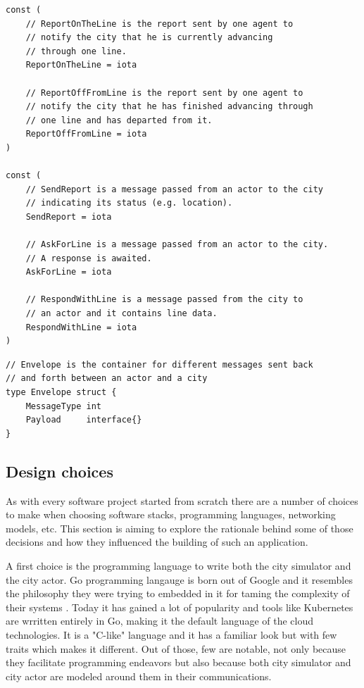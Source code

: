 \documentclass[conference]{IEEEtran}
\begin{document}
\begin{lstlisting}[caption=Go enumerations for messaging, label=lst:goactorreports]
const (   
    // ReportOnTheLine is the report sent by one agent to
    // notify the city that he is currently advancing
    // through one line.
    ReportOnTheLine = iota
    
    // ReportOffFromLine is the report sent by one agent to
    // notify the city that he has finished advancing through
    // one line and has departed from it.
    ReportOffFromLine = iota
)
    
const (
    // SendReport is a message passed from an actor to the city
    // indicating its status (e.g. location).
    SendReport = iota
    
    // AskForLine is a message passed from an actor to the city.
    // A response is awaited.
    AskForLine = iota
    
    // RespondWithLine is a message passed from the city to
    // an actor and it contains line data.
    RespondWithLine = iota
)
\end{lstlisting}

\begin{lstlisting}[caption=Go top level struct (envelope), label=lst:goenvelope]
// Envelope is the container for different messages sent back
// and forth between an actor and a city
type Envelope struct {
    MessageType int
    Payload     interface{}
}
\end{lstlisting}

\subsection{Design choices}
\label{subsec:designchoices}

As with every software project started from scratch there are a number of choices to make when choosing software stacks, programming languages, networking models, etc. This section is aiming to explore the rationale behind some of those decisions and how they influenced the building of  such an application.

A first choice is the programming language to write both the city simulator and the city actor. Go programming langauge is born out of Google and it resembles the philosophy they were trying to embedded in it for taming the complexity of their systems \citep{donovan2015go}. Today it has gained a lot of popularity and tools like Kubernetes are wrritten entirely in Go, making it the default language of the cloud technologies. It is a "C-like" language and it has a familiar look but with few traits which makes it different. Out of those, few are notable, not only because they facilitate programming endeavors but also because both city simulator and city actor are modeled around them in their communications. 
\end{document}

